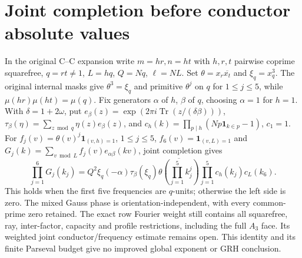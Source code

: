 \section{Joint completion before conductor absolute values}\label{jdq:core}
In the original C--C expansion write $m=hr,n=ht$ with $h,r,t$
pairwise coprime squarefree, $q=rt\ne1$, $L=hq$, $Q=Nq$, $\ell=NL$.
Set $\theta=x_r\overline{x_t}$ and $\xi_q=x_q^3$.
The original internal masks give $\theta^3=\xi_q$ and primitive
$\theta^j$ on $q$ for $1\le j\le5$, while
$\mu(hr)\mu(ht)=\mu(q)$. Fix generators $\alpha$ of $h$, $\beta$ of
$q$, choosing $\alpha=1$ for $h=1$. With $\delta=1+2\omega$, put
$e_\beta(z)=\exp(2\pi i\operatorname{Tr}(z/(\delta\beta)))$,
$\tau_\beta(\eta)=\sum_{z\bmod q}\eta(z)e_\beta(z)$, and
$c_h(k)=\prod_{p\mid h}(Np\mathbf1_{k\in p}-1)$, $c_1=1$.
For $f_j(v)=\theta(v)^j\mathbf1_{(v,h)=1}$, $1\le j\le5$,
$f_6(v)=\mathbf1_{(v,L)=1}$ and
$G_j(k)=\sum_{v\bmod L}f_j(v)e_{\alpha\beta}(kv)$, joint completion gives
\begin{equation}\label{jdq:gauss}
 \prod_{j=1}^6G_j(k_j)=Q^2\xi_q(-\alpha)\tau_\beta(\xi_q)
 \overline{\theta(\prod_{j=1}^5k_j^j)}
 \prod_{j=1}^5c_h(k_j)c_L(k_6).
\end{equation}
This holds when the first five frequencies are $q$-units; otherwise
the left side is zero. The mixed Gauss phase is orientation-independent,
with every common-prime zero retained. The exact row Fourier weight
still contains all squarefree, ray, inter-factor, capacity and profile
restrictions, including the full $A_3$ face. Its weighted joint
conductor/frequency estimate remains open. This identity and its finite
Parseval budget give no improved global exponent or GRH conclusion.
